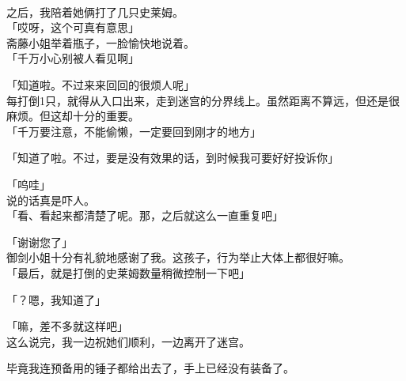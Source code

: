 \sqsplit\\

之后，我陪着她俩打了几只史莱姆。\\

「哎呀，这个可真有意思」\\

斋藤小姐举着瓶子，一脸愉快地说着。\\

「千万小心别被人看见啊」

「知道啦。不过来来回回的很烦人呢」\\

每打倒1只，就得从入口出来，走到迷宫的分界线上。虽然距离不算远，但还是很麻烦。但这却十分的重要。\\

「千万要注意，不能偷懒，一定要回到刚才的地方」

「知道了啦。不过，要是没有效果的话，到时候我可要好好投诉你」

「呜哇」\\

说的话真是吓人。\\

「看、看起来都清楚了呢。那，之后就这么一直重复吧」

「谢谢您了」\\

御剑小姐十分有礼貌地感谢了我。这孩子，行为举止大体上都很好嘛。\\

「最后，就是打倒的史莱姆数量稍微控制一下吧」

「？嗯，我知道了」

「嘛，差不多就这样吧」\\

这么说完，我一边祝她们顺利，一边离开了迷宫。

毕竟我连预备用的锤子都给出去了，手上已经没有装备了。\\
